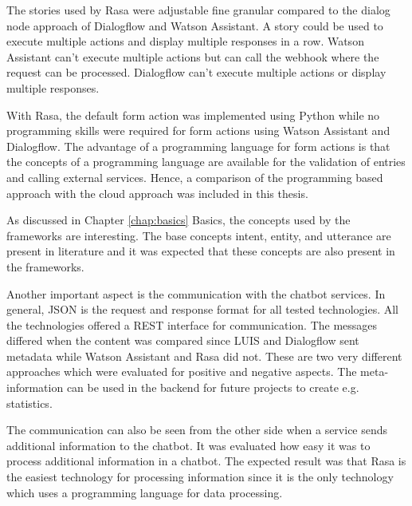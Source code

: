 The stories used by Rasa were adjustable fine granular compared to the dialog node approach of Dialogflow and Watson Assistant.
A story could be used to execute multiple actions and display multiple responses in a row.
Watson Assistant can't execute multiple actions but can call the webhook where the request can be processed.
Dialogflow can't execute multiple actions or display multiple responses. 

With Rasa, the default form action was implemented using Python while no programming skills were required for form actions using Watson Assistant and Dialogflow.
The advantage of a programming language for form actions is that the concepts of a programming language are available for the validation of entries and calling external services.
Hence, a comparison of the programming based approach with the cloud approach was included in this thesis.

As discussed in Chapter \ref{chap:basics} Basics, the concepts used by the frameworks are interesting.
The base concepts intent, entity, and utterance are present in literature and it was expected that these concepts are also present in the frameworks.

Another important aspect is the communication with the chatbot services.
In general, JSON is the request and response format for all tested technologies.
All the technologies offered a REST interface for communication.
The messages differed when the content was compared since 
LUIS and Dialogflow sent metadata while Watson Assistant and Rasa did not.
These are two very different approaches which were evaluated for 
positive and negative aspects.
The meta-information can be used in the backend for future projects to 
create e.g. statistics.

The communication can also be seen from the other side when a service sends additional information to the chatbot.
It was evaluated how easy it was to process additional information
in a chatbot.
The expected result was that Rasa is the easiest technology for processing information since it is the only technology which uses a programming language for data processing.

